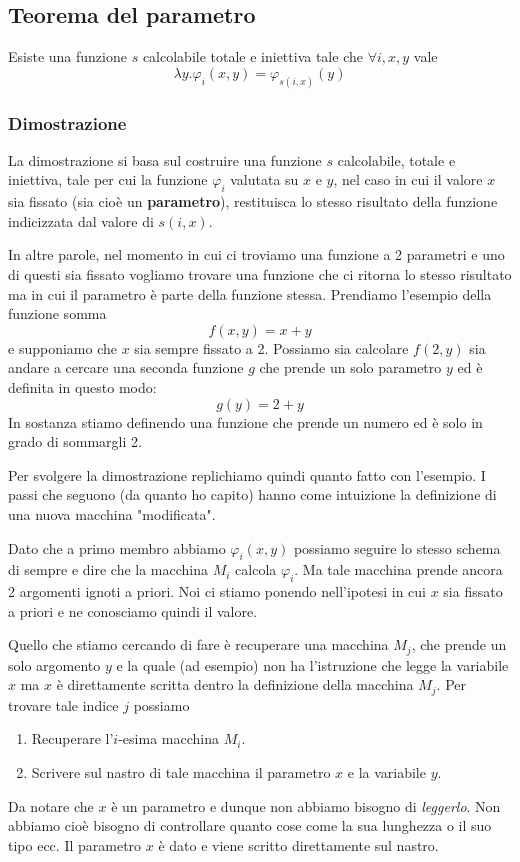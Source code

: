 \subsection{Teorema del parametro}

Esiste una funzione $s$ calcolabile totale e iniettiva tale che
$\forall i, x, y$ vale
\[ \lambda y . \varphi_i(x, y) = \varphi_{s(i,x)} (y) \]

\subsubsection{Dimostrazione}

La dimostrazione si basa sul costruire una funzione $s$
calcolabile, totale e iniettiva, tale per cui la funzione
$\varphi_i$ valutata su $x$ e $y$, nel caso in cui il valore
$x$ sia fissato (sia cioè un \textbf{parametro}), restituisca
lo stesso risultato della funzione indicizzata dal valore di
$s(i, x)$.

In altre parole, nel momento in cui ci troviamo una funzione
a 2 parametri e uno di questi sia fissato vogliamo trovare una
funzione che ci ritorna lo stesso risultato ma in cui il
parametro è parte della funzione stessa. Prendiamo l'esempio
della funzione somma
\[ f(x, y) = x + y \]
e supponiamo che $x$ sia sempre fissato a 2. Possiamo sia
calcolare $f(2, y)$ sia andare a cercare una seconda funzione
$g$ che prende un solo parametro $y$ ed è definita in questo
modo:
\[ g(y) = 2 + y \]
In sostanza stiamo definendo una funzione che prende un numero
ed è solo in grado di sommargli 2.

Per svolgere la dimostrazione replichiamo quindi quanto fatto
con l'esempio. I passi che seguono (da quanto ho capito) hanno
come intuizione la definizione di una nuova macchina
"modificata".

Dato che a primo membro abbiamo $\varphi_i (x,y)$ possiamo
seguire lo stesso schema di sempre e dire che la macchina $M_i$
calcola $\varphi_i$. Ma tale macchina prende ancora 2 argomenti
ignoti a priori. Noi ci stiamo ponendo nell'ipotesi in cui $x$
sia fissato a priori e ne conosciamo quindi il valore.

Quello che stiamo cercando di fare è recuperare una macchina
$M_j$, che prende un solo argomento $y$ e la quale (ad esempio)
non ha l'istruzione che legge la variabile $x$ ma $x$ è
direttamente scritta dentro la definizione della macchina $M_j$.
Per trovare tale indice $j$ possiamo
\begin{enumerate}
	\item Recuperare l'$i$-esima macchina $M_i$.
	\item Scrivere sul nastro di tale macchina il parametro $x$
	      e la variabile $y$.
\end{enumerate}
Da notare che $x$ è un parametro e dunque non abbiamo bisogno di
\emph{leggerlo}. Non abbiamo cioè bisogno di controllare quanto
cose come la sua lunghezza o il suo tipo ecc. Il parametro $x$
è dato e viene scritto direttamente sul nastro.

